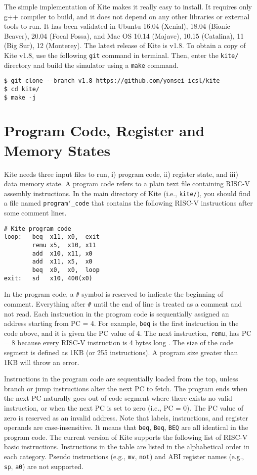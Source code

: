 \documentclass[10pt]{article}
\begin{document}
The simple implementation of Kite makes it really easy to install.
It requires only g++ compiler to build, and it does not depend on any other libraries or external tools to run.
It has been validated in Ubuntu 16.04 (Xenial), 18.04 (Bionic Beaver), 20.04 (Focal Fossa), and Mac OS 10.14 (Majave), 10.15 (Catalina), 11 (Big Sur), 12 (Monterey).
The latest release of Kite is v1.8.
To obtain a copy of Kite v1.8, use the following {\tt git} command in terminal.
Then, enter the {\tt kite/} directory and build the simulator using a {\tt make} command.

\begin{Verbatim}[frame=single,fontsize=\small]
$ git clone --branch v1.8 https://github.com/yonsei-icsl/kite
$ cd kite/
$ make -j
\end{Verbatim}


\section{Program Code, Register and Memory States} \label{sec:inputs}
Kite needs three input files to run, i) program code, ii) register state, and iii) data memory state.
A program code refers to a plain text file containing RISC-V assembly instructions.
In the main directory of Kite (i.e., {\tt kite/}), you should find a file named {\tt program\char`_code} that contains the following RISC-V instructions after some comment lines.
\pagebreak

\begin{Verbatim}[frame=single,fontsize=\small]
# Kite program code
loop:   beq  x11, x0,  exit
        remu x5,  x10, x11
        add  x10, x11, x0
        add  x11, x5,  x0
        beq  x0,  x0,  loop
exit:   sd   x10, 400(x0)
\end{Verbatim}

In the program code, a {\tt \#} symbol is reserved to indicate the beginning of comment.
Everything after {\tt \#} until the end of line is treated as a comment and not read.
Each instruction in the program code is sequentially assigned an address starting from PC = 4.
For example, {\tt beq} is the first instruction in the code above, and it is given the PC value of 4.
The next instruction, {\tt remu}, has PC = 8 because every RISC-V instruction is 4 bytes long \cite{waterman_riscv2019}.
The size of the code segment is defined as 1KB (or 255 instructions).
A program size greater than 1KB will throw an error.

Instructions in the program code are sequentially loaded from the top, unless branch or jump instructions alter the next PC to fetch.
The program ends when the next PC naturally goes out of code segment where there exists no valid instruction, or when the next PC is set to zero (i.e., PC = 0).
The PC value of zero is reserved as an invalid address.
Note that labels, instructions, and register operands are case-insensitive.
It means that {\tt beq}, {\tt Beq}, {\tt BEQ} are all identical in the program code.
The current version of Kite supports the following list of RISC-V basic instructions.
Instructions in the table are listed in the alphabetical order in each category.
Pseudo instructions (e.g., {\tt mv}, {\tt not}) and ABI register names (e.g., {\tt sp}, {\tt a0}) are not supported.
 
\end{document}
